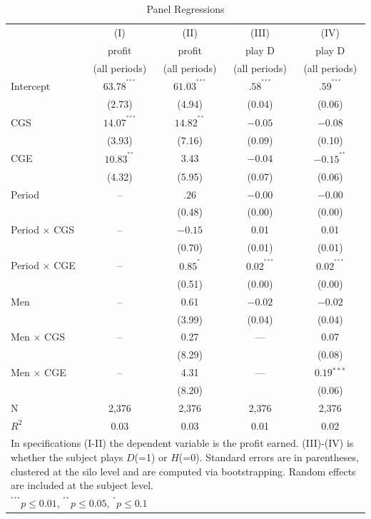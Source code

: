 \documentclass[12pt, letterpaper]{article}
\theoremstyle{plain}
\begin{document}
\begin{table}[ht]
\centering
\caption{Panel Regressions}
\footnotesize
\begin{tabular}{lcccc}

  & (I) & (II) & (III) & (IV)\\
&  profit &  profit & play D & play D \\
&  (all periods) &  (all periods)  & (all periods)  & (all periods) \\

    \hline
Intercept & $63.78^{^{***}}$ & $61.03^{^{***}}$ & $.58^{^{***}}$& $.59^{^{***}}$\\
& (2.73) & (4.94) & (0.04) & (0.06)\\
CGS &  $14.07^{^{***}}$  &  $14.82^{^{**}}$ &  $-0.05$ & $-0.08$\\
& (3.93)  & (7.16) & (0.09) & (0.10)\\
CGE  &  $10.83^{^{**}}$  &  $3.43$ &  $-0.04$ & $-0.15^{^{**}}$\\
 & (4.32) & (5.95) & (0.07) & (0.06)\\
 Period & -- & $.26$ &  $ -0.00$ & $ -0.00$\\
 & & (0.48) & (0.00) & (0.00) \\
Period $\times$ CGS & --  & $-0.15$ & 0.01 & 0.01 \\
 & &(0.70) & (0.01) & (0.01) \\
Period $\times$ CGE & --  &$0.85^{^{*}}$ & $0.02^{^{***}}$ & $0.02^{^{***}}$ \\
  && (0.51) & (0.00) &  (0.00)\\
Men & --  & 0.61  & $-0.02$ &  $-0.02$ \\
 & &(3.99)  & (0.04) & (0.04)\\
Men $\times$ CGS &-- &  0.27 & --- & 0.07\\
 && (8.29)&  & (0.08)\\
Men $\times$ CGE & -- & 4.31 & --- & $0.19{^{***}}$\\
&& (8.20)&& (0.06)\\

\hline
N & 2,376 & 2,376 & 2,376  & 2,376  \\ 
$R^2$ & 0.03 & 0.03 & 0.01 & 0.02\\
\hline
\hline
 \multicolumn{5}{p{.55\textwidth}}{\scriptsize{In specifications (I-II) the dependent variable is the profit earned. (III)-(IV) is whether the subject plays $D$(=1) or $H$(=0). Standard errors are in parentheses, clustered at the silo level and are computed via bootstrapping. Random effects are included at the subject level. }}\\ 
 \multicolumn{5}{p{0.4\textwidth}}{\scriptsize{ $^{^{***}}p\leq0.01$,
    $^{^{**}}p\leq0.05$, $^{^{*}}p\leq0.1$}} \\
\end{tabular}
\label{table:ols_all}
\end{table}
\end{document}
